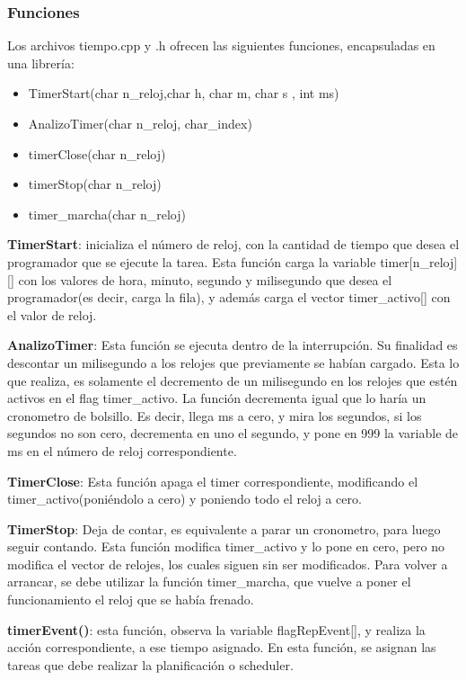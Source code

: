 \subsubsection{Funciones}
Los archivos tiempo.cpp y .h ofrecen las siguientes funciones, encapsuladas en una librería:
\begin{itemize}
\item TimerStart(char n\_reloj,char h, char m, char s , int ms)
\item AnalizoTimer(char n\_reloj, char\_index) 
\item timerClose(char n\_reloj) 
\item timerStop(char n\_reloj)
\item timer\_marcha(char n\_reloj) 
\end{itemize}



\textbf{TimerStart}:  inicializa el número de reloj, con la cantidad de tiempo que desea el programador que se ejecute la tarea. Esta función carga la variable timer[n\_reloj][] con los valores de hora, minuto, segundo y milisegundo que desea el programador(es decir, carga la fila), y además carga el vector timer\_activo[] con el valor de reloj. 

\textbf{AnalizoTimer}: Esta función se ejecuta dentro de la interrupción. Su finalidad es descontar un milisegundo a los relojes que previamente se habían cargado. Esta lo que realiza, es solamente el decremento de un milisegundo en los relojes que estén activos en el flag timer\_activo. La función decrementa igual que lo haría un cronometro de bolsillo. Es decir, llega ms a cero, y mira los segundos, si los segundos no son cero, decrementa en uno el segundo, y pone en 999 la variable de ms en el número de reloj correspondiente.  

\textbf{TimerClose}: Esta función apaga el timer correspondiente, modificando el timer\_activo(poniéndolo a cero) y poniendo todo el reloj a cero. 

\textbf{TimerStop}: Deja de contar, es equivalente a parar un cronometro, para luego seguir contando. Esta función modifica timer\_activo y lo pone en cero, pero no modifica el vector de relojes, los cuales siguen sin ser modificados. Para volver a arrancar, se debe utilizar la función timer\_marcha, que vuelve a poner el funcionamiento el reloj que se había frenado. 

\textbf{timerEvent()}: esta función, observa la variable flagRepEvent[], y realiza la acción correspondiente, a ese tiempo asignado. En esta función, se asignan las tareas que debe realizar la planificación o scheduler.

